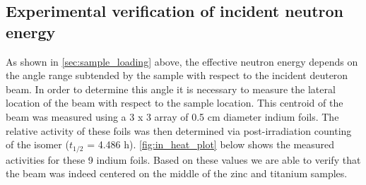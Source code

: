 \documentclass[5p]{elsarticle}
\begin{document}



\subsection{Experimental verification of incident neutron energy}\label{sec:lee_sec}

As shown in \autoref{sec:sample_loading} above, the effective neutron energy depends on the angle range subtended by the sample with respect to the incident deuteron beam.  In order to determine this angle it is necessary to measure the lateral location of the beam with respect to the sample location.  This centroid of the beam was measured using a 3 x 3 array of 0.5 cm diameter indium foils.  The relative activity of these foils was then determined via post-irradiation counting of the  isomer ($t_{1/2}$ = 4.486 h).  \autoref{fig:in_heat_plot} below shows the measured activities for these 9 indium foils.  Based on these values we are able to verify that the beam was indeed centered on the middle of the zinc and titanium samples.   
\end{document}
